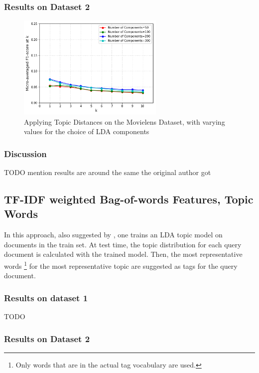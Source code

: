 \subsubsection{Results on Dataset 2}

\begin{figure}[H]
    \centering
    \includegraphics[width=7cm]{chapters/05_experiments/images/movielens-topic-distances.png}
    \caption{Applying Topic Distances on the Movielens Dataset, with varying values for the choice of LDA components}
    \label{fig:ovr_svm_movielens}
\end{figure}

\subsubsection{Discussion}

{\color{red} TODO mention results are around the same the original author got}

\subsection{TF-IDF weighted Bag-of-words Features, Topic Words}

In this approach, also suggested by \cite{choubey_2011}, one trains an LDA topic model on documents in the train set. At test time, the topic distribution for each query document is calculated with the trained model. Then, the most representative words \footnote{Only words that are in the actual tag vocabulary are used.} for the most representative topic are suggested as tags for the query document.

\subsubsection{Results on dataset 1}

{\color{red} TODO}

\subsubsection{Results on Dataset 2}

